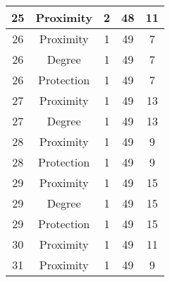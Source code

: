\documentclass[results.tex]{subfiles}
\begin{document}
\begin{center}
\begin{tabular}{| c || c | c | c | c |}
            \hline
            25                      & Proximity                    & 2                      & 48                      & 11                   \\
            \hline
            26                      & Proximity                    & 1                      & 49                      & 7                    \\
            \hline
            26                      & Degree                       & 1                      & 49                      & 7                    \\
            \hline
            26                      & Protection                   & 1                      & 49                      & 7                    \\
            \hline
            27                      & Proximity                    & 1                      & 49                      & 13                   \\
            \hline
            27                      & Degree                       & 1                      & 49                      & 13                   \\
            \hline
            28                      & Proximity                    & 1                      & 49                      & 9                    \\
            \hline
            28                      & Protection                   & 1                      & 49                      & 9                    \\
            \hline
            29                      & Proximity                    & 1                      & 49                      & 15                   \\
            \hline
            29                      & Degree                       & 1                      & 49                      & 15                   \\
            \hline
            29                      & Protection                   & 1                      & 49                      & 15                   \\
            \hline
            30                      & Proximity                    & 1                      & 49                      & 11                   \\
            \hline
            31                      & Proximity                    & 1                      & 49                      & 9                    \\

\end{tabular}
\end{center}
\end{document}
